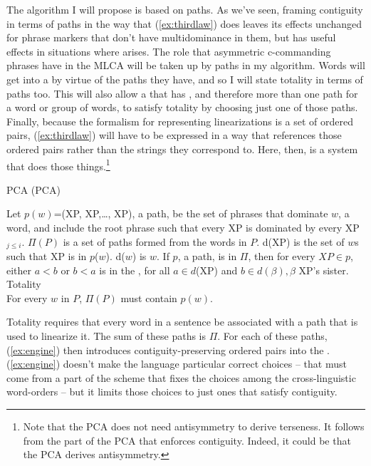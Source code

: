 \documentclass[output=paper]{langsci/langscibook}
\begin{document}
The  algorithm I will propose is based on paths. As we've seen,
framing contiguity in terms of paths in the way that (\ref{ex:thirdlaw}) does
leaves its effects unchanged for phrase markers that don't have multidominance
in them, but has useful effects in situations where  arises. The
role that asymmetric c-commanding phrases have in the \gls{MLCA} will be taken
up by paths in my algorithm. Words will get into a  by virtue of
the paths they have, and so I will state totality in terms of paths too. This
will also allow a  that has , and therefore more
than one path for a word or group of words, to satisfy totality by choosing
just one of those paths. Finally, because the formalism for representing
linearizations is a set of ordered pairs, (\ref{ex:thirdlaw}) will have to be
expressed in a way that references those ordered pairs rather than the strings
they correspond to. Here, then, is a system that does those
things.\footnote{Note that the \gls{PCA} does not need antisymmetry to
derive terseness. It follows from the part of the \gls{PCA} that enforces
contiguity. Indeed, it could be that the \gls{PCA} derives antisymmetry.}
\begin{exe}
    \ex \label{ex:pca} \glsdesc{PCA} (\gls{PCA})
	\begin{xlist}
		\ex Let $p(w)$=(XP, XP,\ldots, XP), a path, be the set of phrases that dominate $w$, a word, and include the root phrase such that every XP is dominated by every XP$_{j \leq i}$.
		\ex $\Pi(P)$ is a set of paths formed from the words in $P.$
		\ex d(XP) is the set of $w$s such that XP is in $p$($w$). d($w$) is $w$.
		\ex \label{ex:engine} If $p$, a path, is in $\Pi$, then for every $XP \in p$, either $a<b$ or $b<a$ is in the , for all $a \in d$(XP) and $b \in d(\beta), \beta$ XP's sister.
		\ex Totality\\
		For every $w$ in $P$, $\Pi(P)$ must contain $p(w)$.
	\end{xlist}
\end{exe}

Totality requires that every word in a sentence be associated with a path that is used to linearize it. The sum of these paths is $\Pi$. For each of these paths, (\ref{ex:engine}) then introduces contiguity-preserving ordered pairs into the . (\ref{ex:engine}) doesn't make the language particular correct choices -- that must come from a part of the  scheme that fixes the choices among the cross-linguistic word-orders -- but it limits those choices to just ones that satisfy contiguity.
\end{document}
